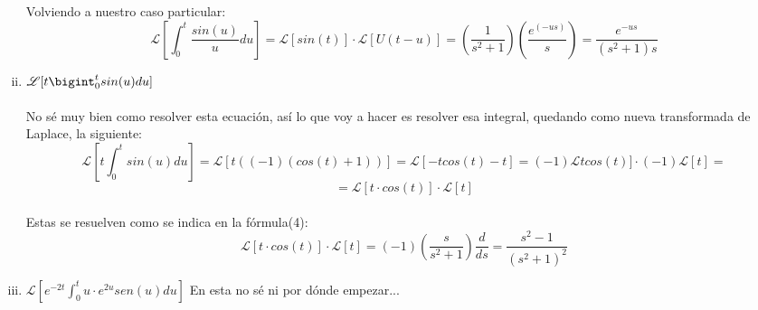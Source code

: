 \documentclass[11pt]{article}
\def\Laplace#1{\mathscr{L}}%
\begin{document}
\begin{enumerate}[(i)]
Volviendo a nuestro caso particular:
$$\Laplace[[\int_0^{t}\dfrac{sin(u)}{u}du]=\Laplace[[sin(t)]\cdot \Laplace[[U(t-u)]=\left(\dfrac{1}{s^2+1}\right)\left(\dfrac{e^{(-us)}}{s}\right)=\dfrac{e^{-us}}{(s^2+1)s}$$

\item $\Laplace[[t \bigint_0^{t}sin(u)du]$ \\ \\
No sé muy bien como resolver esta ecuación, así lo que voy a hacer es resolver esa integral, quedando como nueva transformada de Laplace, la siguiente:
$$\Laplace[[t \int_0^{t}sin(u)du]=\Laplace[[t((-1)(cos(t)+1))]=\Laplace[[-tcos(t)-t]=(-1)\Laplace[tcos(t)]\cdot(-1)\Laplace[[t]=$$
$$= \Laplace[[t\cdot cos(t)]\cdot\Laplace[[t]$$ 
\\ Estas se resuelven como se indica en la fórmula(4):
$$\Laplace[[t\cdot cos(t)]\cdot\Laplace[[t]=(-1)\left(\dfrac{s}{s^2+1}\right)\dfrac{d}{ds}=\dfrac{s^2-1}{(s^2+1)^2}$$
\clearpage
\item $\Laplace[[e^{-2t}\int_0^tu\cdot e^{2u}sen(u)du]$
En esta no sé ni por dónde empezar... \\ \\

\end{enumerate}
\end{document}
